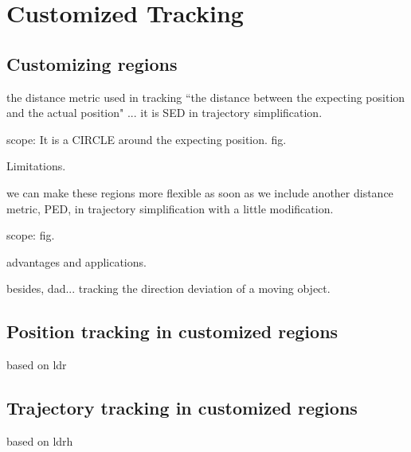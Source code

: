 

\section{Customized Tracking}
\label{sec:position}


\subsection{Customizing regions}

the distance metric used in tracking ``the distance between the expecting position and the actual position" ... it is SED in trajectory simplification. 

scope: It is  a CIRCLE around the expecting position. fig.

Limitations.

we can make these regions more flexible as soon as we include another distance metric, PED, in trajectory simplification with a little modification.

scope: fig.

advantages and applications.

besides, dad... tracking the direction deviation of a moving object.
 
\subsection{Position tracking in customized regions}
based on ldr


\subsection{Trajectory tracking in customized regions}
based on ldrh


